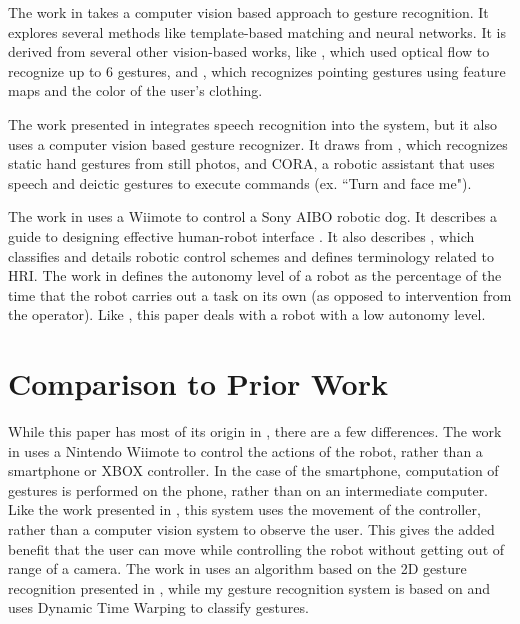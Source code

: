 \documentclass[12pt, letterpaper]{report}
\begin{document}
The work in \cite{Waldherr} takes a computer vision based approach to gesture recognition. It explores several methods like template-based matching and neural networks. It is derived from several other vision-based works, like \cite{Kortenkamp}, which used optical flow to recognize up to 6 gestures, and \cite{Kahn}, which recognizes pointing gestures using feature maps and the color of the user's clothing.

The work presented in \cite{Rogalla} integrates speech recognition into the system, but it also uses a computer vision based gesture recognizer. It draws from \cite{Kestler}, which recognizes static hand gestures from still photos, and CORA, a robotic assistant that uses speech and deictic gestures to execute commands (ex. ``Turn and face me").

The work in \cite{Guo} uses a Wiimote to control a Sony AIBO robotic dog. It describes a guide to designing effective human-robot interface \cite{GoodrichOlsen}. It also describes \cite{YancoDrury}, which classifies and details robotic control schemes and defines terminology related to HRI. The work in \cite{YancoDrury} defines the autonomy level of a robot as the percentage of the time that the robot carries out a task on its own (as opposed to intervention from the operator). Like \cite{Guo}, this paper deals with a robot with a low autonomy level.

\section*{Comparison to Prior Work}
While this paper has most of its origin in \cite{Varcholik_Barber_Nicholson_2008}, there are a few differences. The work in \cite{Varcholik_Barber_Nicholson_2008} uses a Nintendo Wiimote to control the actions of the robot, rather than a smartphone or XBOX controller. In the case of the smartphone, computation of gestures is performed on the phone, rather than on an intermediate computer. Like the work presented in \cite{Varcholik_Barber_Nicholson_2008}, this system uses the movement of the controller, rather than a computer vision system to observe the user. This gives the added benefit that the user can move while controlling the robot without getting out of range of a camera. The work in \cite{Varcholik_Barber_Nicholson_2008} uses an algorithm based on the 2D gesture recognition presented in \cite{Rubine}, while my gesture recognition system is based on \cite{TaKG} and uses Dynamic Time Warping to classify gestures. 
\end{document}
